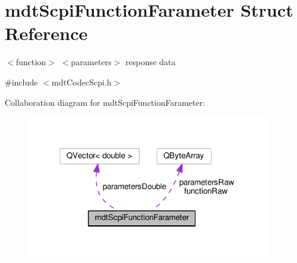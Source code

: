\hypertarget{structmdt_scpi_function_farameter}{\section{mdt\-Scpi\-Function\-Farameter Struct Reference}
\label{structmdt_scpi_function_farameter}
}


$<$function$>$ $<$parameters$>$ response data  




{\ttfamily \#include $<$mdt\-Codec\-Scpi.\-h$>$}



Collaboration diagram for mdt\-Scpi\-Function\-Farameter\-:
\nopagebreak
\begin{figure}[H]
\begin{center}
\leavevmode
\includegraphics[width=299pt]{structmdt_scpi_function_farameter__coll__graph}
\end{center}
\end{figure}

